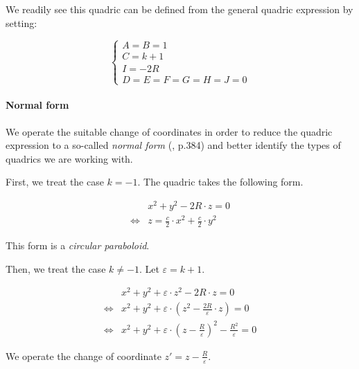 We readily see this quadric can be defined from the general quadric expression
by setting:

\begin{equation} \begin{cases}
A = B = 1 \\
C = k + 1 \\
I = -2 R \\
D = E = F = G = H = J = 0
\end{cases} \end{equation}

\paragraph{Normal form}
We operate the suitable change of coordinates in order to reduce the quadric
expression to a so-called \emph{normal form} (\cite{wiki:quadric},
\cite{Venit:2008} p.384) and better identify the types of quadrics we are
working with.

First, we treat the case $k=-1$.
The quadric takes the following form.

\begin{equation} \begin{split}
&x^2 + y^2 - 2 R \cdot z = 0 \\
\iff &z = \frac{c}{2} \cdot x^2 + \frac{c}{2} \cdot y^2
\end{split} \end{equation}

This form is a \emph{circular paraboloid}.

Then, we treat the case $k \neq -1$. Let $\varepsilon = k + 1$.

\begin{equation} \begin{split}
& x^2 + y^2 + \varepsilon \cdot z^2 - 2 R \cdot z = 0 \\
\iff & x^2 + y^2 + \varepsilon \cdot \left( z^2 - \frac{2R}{\varepsilon} \cdot z\right) = 0 \\
\iff & x^2 + y^2 + \varepsilon \cdot \left( z - \frac{R}{\varepsilon} \right)^2 - \frac{R^2}{\varepsilon}
       = 0
\end{split} \end{equation}

We operate the change of coordinate $z' = z - \frac{R}{\varepsilon}$.

